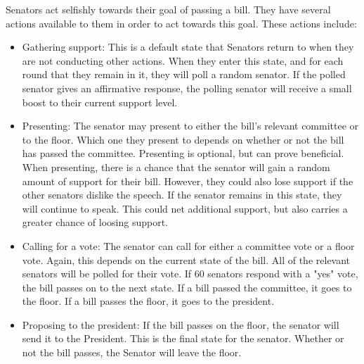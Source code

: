 \documentclass{sig-alternate}
\newenvironment{smallitem}
 {\setlength{\topsep}{0pt}
  \setlength{\partopsep}{0pt}
  \setlength{\parskip}{0pt}
  \begin{itemize}
   \setlength{\leftmargin}{.2in}
  \setlength{\parsep}{0pt}
  \setlength{\parskip}{0pt}
  \setlength{\itemsep}{0pt}}
 {\end{itemize}}
\newcommand{\bi}{\begin{smallitem}}
\newcommand{\ei}{\end{smallitem}}
\begin{document}
Senators act selfishly towards their goal of passing a bill. They have several actions available to them in order to act towards this goal. These actions include:
\bi
\item Gathering support: This is a default state that Senators return to when they are not conducting other actions. When they enter this state, and for each round that they remain in it, they will poll a random senator. If the polled senator gives an affirmative response, the polling senator will receive a small boost to their current support level. 
\item Presenting: The senator may present to either the bill's relevant committee or to the floor. Which one they present to depends on whether or not the bill has passed the committee. Presenting is optional, but can prove beneficial. When presenting, there is a chance that the senator will gain a random amount of support for their bill. However, they could also lose support if the other senators dislike the speech. If the senator remains in this state, they will continue to speak. This could net additional support, but also carries a greater chance of loosing support. 
\item Calling for a vote: The senator can call for either a committee 
vote or a floor vote. Again, this depends on the current state of the 
bill. All of the relevant senators will be polled for their vote. 
If 60 senators respond with a "yes" vote, the bill passes on to the 
next state. If a bill passed the committee, it goes to the floor. If a bill passes the floor, it goes to the president. 
\item Proposing to the president: If the bill passes on the floor, the senator will send it to the President. This is the final state for the senator. Whether or not the bill passes, the Senator will leave the floor. 
\ei
\end{document}

